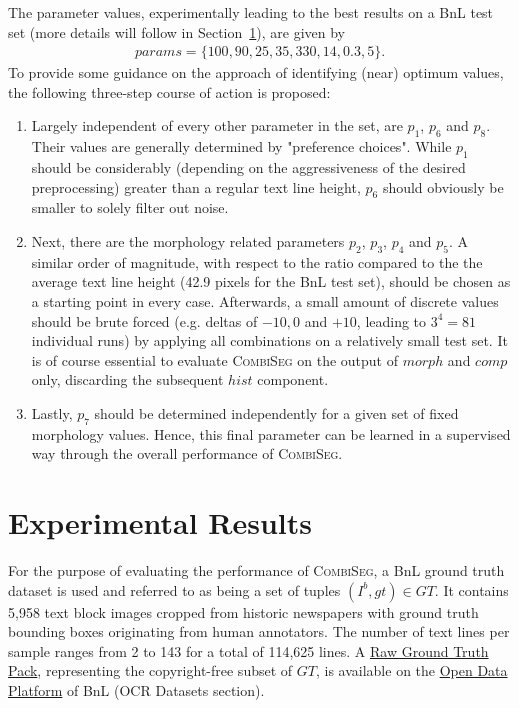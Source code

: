 \documentclass{jdmdh}
\begin{document}
The parameter values, experimentally leading to the best results on a BnL test set (more details will follow in Section~\ref{section:results}), are given by
\begin{align}
 params=\{100, 90, 25, 35, 330, 14, 0.3, 5\}.
\end{align}
To provide some guidance on the approach of identifying (near) optimum values, the following three-step course of action is proposed: \\
\begin{enumerate}
    \item Largely independent of every other parameter in the set, are $p_1$, $p_6$ and $p_8$. Their values are generally determined by "preference choices". While $p_1$ should be considerably (depending on the aggressiveness of the desired preprocessing) greater than a regular text line height, $p_6$ should obviously be smaller to solely filter out noise. \\
    \item Next, there are the morphology related parameters $p_2$, $p_3$, $p_4$ and $p_5$. A similar order of magnitude, with respect to the ratio compared to the the average text line height (42.9 pixels for the BnL test set), should be chosen as a starting point in every case. Afterwards, a small amount of discrete values should be brute forced (e.g. deltas of $-10, 0$ and $+10$, leading to $3^4\!=\!81$ individual runs) by applying all combinations on a relatively small test set. It is of course essential to evaluate \textsc{CombiSeg} on the output of $morph$ and $comp$ only, discarding the subsequent $hist$ component. \\
    \item Lastly, $p_7$ should be determined independently for a given set of fixed morphology values. Hence, this final parameter can be learned in a supervised way through the overall performance of \textsc{CombiSeg}. \\
\end{enumerate}
\section{Experimental Results} \label{section:results}

For the purpose of evaluating the performance of \textsc{CombiSeg}, a BnL ground truth dataset is used and referred to as being a set of tuples $(I^b, gt)\!\in\!GT$. It contains 5,958 text block images cropped from historic newspapers with ground truth bounding boxes originating from human annotators. The number of text lines per sample ranges from 2 to 143 for a total of 114,625 lines. A \href{https://data.bnl.lu/wp-content/uploads/2021/09/bnl-ground-truth-newspapers-before-1878-raw.zip}{Raw Ground Truth Pack}, representing the copyright-free subset of $GT$, is available on the \href{https://data.bnl.lu/data/historical-newspapers/}{Open Data Platform} of BnL (OCR Datasets section).
\end{document}
